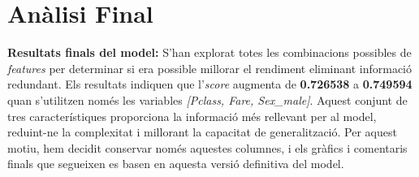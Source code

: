 \documentclass[9pt,a4paper,twoside]{tau-class/tau}
\begin{document}
\begin{table}[ht]
\centering
\tiny %
\setlength{\tabcolsep}{1.5pt} %
\caption{Comparació de models amb els millors hiperparàmetres i el seu \textit{mean test score}.}
\label{tab:model_params_small}
\end{table}

\section{Anàlisi Final}

\textbf{Resultats finals del model:}
S'han explorat totes les combinacions possibles de \textit{features} per determinar si era possible millorar el rendiment eliminant informació redundant. Els resultats indiquen que l'\textit{score} augmenta de \textbf{0.726538} a \textbf{0.749594} quan s'utilitzen només les variables \textit{[Pclass, Fare, Sex\_male]}. Aquest conjunt de tres característiques proporciona la informació més rellevant per al model, reduint-ne la complexitat i millorant la capacitat de generalització. Per aquest motiu, hem decidit conservar només aquestes columnes, i els gràfics i comentaris finals que segueixen es basen en aquesta versió definitiva del model.
\end{document}
